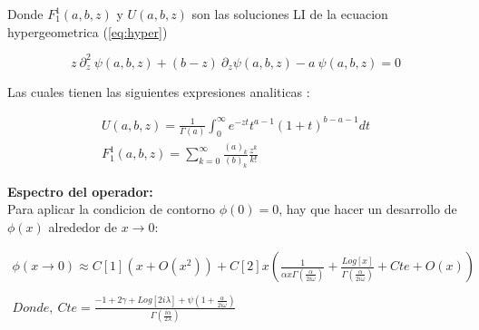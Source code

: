 Donde $F _1 ^1(a,b,z)$ y $ U(a,b,z)$ son las soluciones LI de la ecuacion hypergeometrica (\ref{eq:hyper})

\begin{equation}
    z \ \partial ^2 _z \ \psi (a,b,z) + (b-z) \
    \partial _z \psi (a,b,z)
    -a \ \psi (a,b,z) = 0
\label{eq:hyper}
\end{equation}

Las cuales tienen las siguientes expresiones analiticas  : 

\begin{equation}
\begin{array}{c}
	U(a,b,z) = \frac{1}{\Gamma (a)} 
	\int _0 ^{\infty} e ^{-zt}
	t ^{a-1}
	(1+t) ^{b-a-1}
	dt \\
	F _1 ^1 (a,b,z) = \sum _ {k=0} ^{\infty} 
	\frac{(a) _k}{(b) _k} 
	\frac{z ^k}{k!} 
\end{array}
\end{equation}






\textbf{Espectro del operador:} \\


Para aplicar la condicion de contorno $\phi (0) = 0$, hay que hacer un desarrollo de $\phi(x)$  alrededor de $x \rightarrow 0$:

\begin{equation}
\begin{array}{c}
\phi (x \rightarrow 0) \approx
C[1] ( x + O(x ^2)) + 
C[2] x 
\left( 
\frac{1}{  \alpha x  \Gamma ( \frac{ \alpha}{2 i \omega}  )   }  +
\frac{Log[x] }{\Gamma ( \frac{ \alpha}{2 i \omega} ) } + Cte + O(x)
\right)
\\ \\
Donde,  \ Cte = 
\frac{
-1 + 2 \gamma + Log[2 i \lambda] + \psi (1 + \frac{ \alpha}{2 i \omega})
}
{\Gamma (\frac{i \alpha}{2 \lambda})}
\end{array}
\label{eq.scat}
\end{equation}

